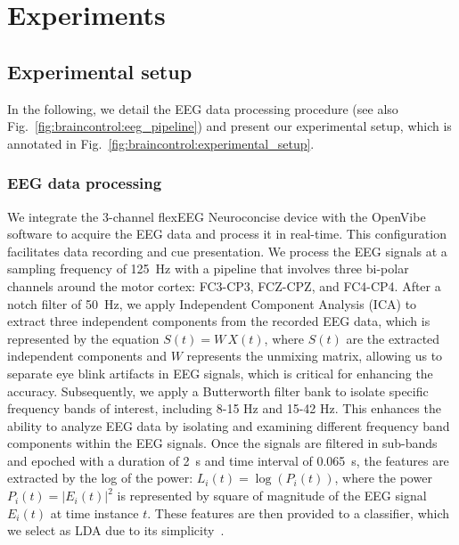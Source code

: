 \section{Experiments}

\subsection{Experimental setup}
In the following, we detail the \gls{EEG} data processing procedure (see also Fig.~\ref{fig:braincontrol:eeg_pipeline}) and present our experimental setup, which is annotated in Fig.~\ref{fig:braincontrol:experimental_setup}.

\subsubsection{EEG data processing}\label{ssub:braincontrol:eeg_pipeline}
We integrate the 3-channel flexEEG Neuroconcise device with the OpenVibe software
to acquire the EEG data and process it in real-time.
This configuration facilitates data recording and cue presentation. We process the \gls{EEG} signals at a sampling frequency of \SI{125}{Hz} with a pipeline that involves three bi-polar channels around the motor cortex: FC3-CP3, FCZ-CPZ, and FC4-CP4.
After a notch filter of \SI{50}{Hz}, we apply Independent Component Analysis (ICA) to extract three independent components from the recorded \gls{EEG} data, which is represented by the equation $S(t) = W \, X(t)$, where $S(t)$ are the extracted independent components and $W$ represents the unmixing matrix, allowing us to separate eye blink artifacts in \gls{EEG} signals, which is critical for enhancing the accuracy. 
Subsequently, we apply a Butterworth filter bank to isolate specific frequency bands of interest, including 8-15 \si{Hz} and 15-42 \si{Hz}. 
This enhances the ability to analyze \gls{EEG} data by isolating and examining different frequency band components within the \gls{EEG} signals. Once the signals are filtered in sub-bands and epoched with a duration of \SI{2}{s} and time interval of \SI{0.065}{s}, the features are extracted by the log of the power: $L_i(t) = \log\left(P_i(t)\right)$, where the power $P_i(t) = |E_i(t)|^2$ is represented by square of magnitude of the \gls{EEG} signal $E_i(t)$ at time instance $t$.
These features are then provided to a classifier, which we select as \gls{LDA} due to its simplicity~\cite{lotte2014tutorial}.

